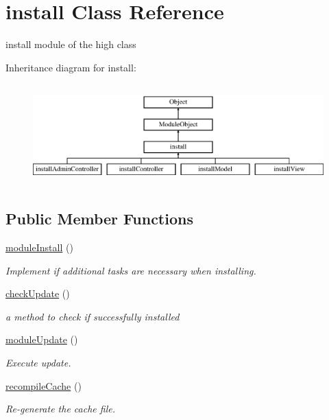 \hypertarget{classinstall}{}\section{install Class Reference}
\label{classinstall}


install module of the high class  


Inheritance diagram for install\+:\begin{figure}[H]
\begin{center}
\leavevmode
\includegraphics[height=3.916084cm]{classinstall}
\end{center}
\end{figure}
\subsection*{Public Member Functions}
\begin{DoxyCompactItemize}
\item 
\hyperlink{classinstall_a4fee6fc0a704c9b0789d894f6243fd8d}{module\+Install} ()
\begin{DoxyCompactList}\small\item\em Implement if additional tasks are necessary when installing. \end{DoxyCompactList}\item 
\hyperlink{classinstall_a45dc7f6b5268beeb21aa3bafa70b5b55}{check\+Update} ()
\begin{DoxyCompactList}\small\item\em a method to check if successfully installed \end{DoxyCompactList}\item 
\hyperlink{classinstall_abb5fea730938b38d5347c4ff44644f2d}{module\+Update} ()
\begin{DoxyCompactList}\small\item\em Execute update. \end{DoxyCompactList}\item 
\hyperlink{classinstall_ac0cf9a2eedd8ed9f01b9d848157403d8}{recompile\+Cache} ()
\begin{DoxyCompactList}\small\item\em Re-\/generate the cache file. \end{DoxyCompactList}\end{DoxyCompactItemize}
